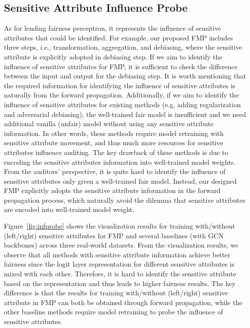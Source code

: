 \documentclass[letterpaper]{article} %
\theoremstyle{plain}
\theoremstyle{definition}
\theoremstyle{remark}
\begin{document}
\subsection{Sensitive Attribute Influence Probe}\label{app:influprob}
As for lending fairness perceptron, it represents the influence of sensitive attributes that could be identified. For example, our proposed FMP includes three steps, i.e., transformation, aggregation, and debiasing, where the sensitive attribute is explicitly adopted in debiasing step. If we aim to identify the influence of sensitive attributes for FMP, it is sufficient to check the difference between the input and output for the debiasing step. It is worth mentioning that the required information for identifying the influence of sensitive attributes is naturally from the forward propagation. Additionally, if we aim to identify the influence of sensitive attributes for existing methods (e.g, adding regularization and adversarial debiasing), the well-trained fair model is insufficient and we need additional vanilla (unfair) model without using any sensitive attribute information. In other words, these methods require model retraining with sensitive attribute movement, and thus much more resources for sensitive attributes influence auditing. The key drawback of these methods is due to encoding the sensitive attributes information into well-trained model weights. From the auditors' perspective, it is quite hard to identify the influence of sensitive attributes only given a well-trained fair model. Instead, our designed FMP explicitly adopts the sensitive attribute information in the forward propagation process, which naturally avoid the dilemma that sensitive attributes are encoded into well-trained model weight.


Figure~\ref{fig:infprobe} shows the visualization results for training with/without (left/right) sensitive attributes for FMP and several baselines (with GCN backbones) across three real-world datasets. From the visualization results, we observe that all methods with sensitive attribute information achieve better fairness since the logit layer representation for different sensitive attributes is mixed with each other. Therefore, it is hard to identify the sensitive attribute based on the representation and thus leads to higher fairness results. The key difference is that the results for training with/without (left/right) sensitive attribute in FMP can both be obtained through forward propagation, while the other baseline methods require model retraining to probe the influence of sensitive attributes.
\end{document}
